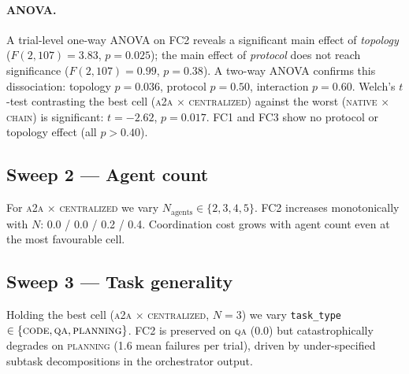 \paragraph{ANOVA.} A trial-level one-way ANOVA on FC2 reveals a
significant main effect of \emph{topology} ($F(2,107) = 3.83$,
$p = 0.025$); the main effect of \emph{protocol} does not reach
significance ($F(2,107) = 0.99$, $p = 0.38$). A two-way ANOVA confirms
this dissociation: topology $p = 0.036$, protocol $p = 0.50$,
interaction $p = 0.60$. Welch's $t$-test contrasting the best cell
(\textsc{a2a} $\times$ \textsc{centralized}) against the worst
(\textsc{native} $\times$ \textsc{chain}) is significant: $t = -2.62$,
$p = 0.017$. FC1 and FC3 show no protocol or topology effect
(all $p > 0.40$).

\subsection{Sweep 2 — Agent count}
For \textsc{a2a} $\times$ \textsc{centralized} we vary
$N_{\text{agents}} \in \{2, 3, 4, 5\}$. FC2 increases monotonically with
$N$: 0.0 / 0.0 / 0.2 / 0.4. Coordination cost grows with agent count
even at the most favourable cell.

\subsection{Sweep 3 — Task generality}
Holding the best cell (\textsc{a2a} $\times$ \textsc{centralized},
$N{=}3$) we vary \texttt{task\_type} $\in \{\textsc{code}, \textsc{qa},
\textsc{planning}\}$. FC2 is preserved on \textsc{qa} (0.0) but
catastrophically degrades on \textsc{planning} (1.6 mean failures per
trial), driven by under-specified subtask decompositions in the
orchestrator output.

